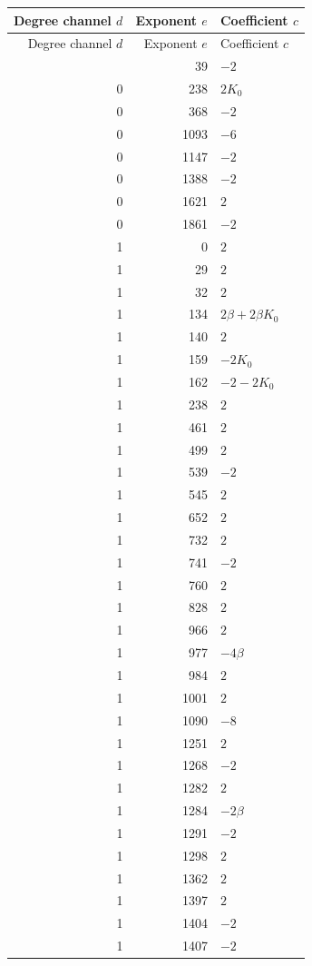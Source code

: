 \small
\begin{longtable}{@{}rrl@{}}
\toprule Degree channel $d$ & Exponent $e$ & Coefficient $c$\\\midrule
\endfirsthead
\toprule Degree channel $d$ & Exponent $e$ & Coefficient $c$\\\midrule
\endhead
\bottomrule\endfoot
0 & 39 & $-2$\\
0 & 238 & $2K_0$\\
0 & 368 & $-2$\\
0 & 1093 & $-6$\\
0 & 1147 & $-2$\\
0 & 1388 & $-2$\\
0 & 1621 & $2$\\
0 & 1861 & $-2$\\
1 & 0 & $2$\\
1 & 29 & $2$\\
1 & 32 & $2$\\
1 & 134 & $2\beta+2\beta K_0$\\
1 & 140 & $2$\\
1 & 159 & $-2K_0$\\
1 & 162 & $-2-2K_0$\\
1 & 238 & $2$\\
1 & 461 & $2$\\
1 & 499 & $2$\\
1 & 539 & $-2$\\
1 & 545 & $2$\\
1 & 652 & $2$\\
1 & 732 & $2$\\
1 & 741 & $-2$\\
1 & 760 & $2$\\
1 & 828 & $2$\\
1 & 966 & $2$\\
1 & 977 & $-4\beta$\\
1 & 984 & $2$\\
1 & 1001 & $2$\\
1 & 1090 & $-8$\\
1 & 1251 & $2$\\
1 & 1268 & $-2$\\
1 & 1282 & $2$\\
1 & 1284 & $-2\beta$\\
1 & 1291 & $-2$\\
1 & 1298 & $2$\\
1 & 1362 & $2$\\
1 & 1397 & $2$\\
1 & 1404 & $-2$\\
1 & 1407 & $-2$\\

\end{longtable}

